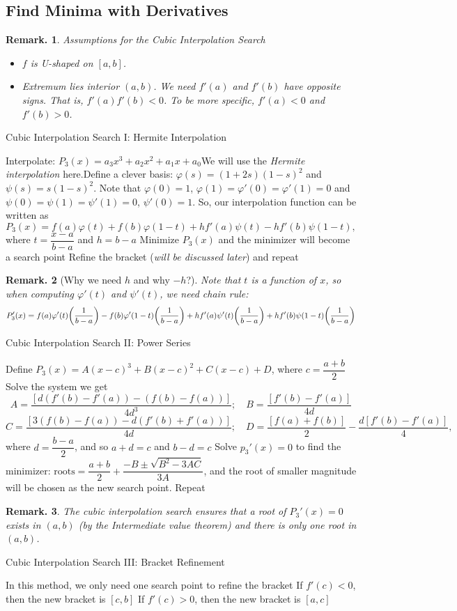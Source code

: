\documentclass[12pt, a4paper]{article}
\newtheorem{rmk}{Remark.}[section]
\def\phi{\varphi}
\begin{document}
\subsection{Find Minima with Derivatives}
\begin{rmk} Assumptions for the Cubic Interpolation Search
\begin{itemize}
	\item $f$ is U-shaped on $[a,b]$.
	\item Extremum lies interior $(a,b)$. We need $f'(a)$ and $f'(b)$ have opposite signs. That is, $f'(a)f'(b)<0$. To be more specific, $f'(a)<0$ and $f'(b)>0$.
\end{itemize}	
\end{rmk}
\begin{algorithm}
	\caption{Cubic Interpolation Search I: Hermite Interpolation}
	Interpolate: $P_3(x)=a_3x^3+a_2x^2+a_1x+a_0$\newline We will use the \textit{Hermite interpolation} here.\newline Define a clever basis: $\phi(s)=(1+2s)(1-s)^2$ and $\psi(s)=s(1-s)^2$. Note that $\phi(0)=1$, $\phi(1)=\phi'(0)=\phi'(1)=0$ and $\psi(0)=\psi(1)=\psi'(1)=0$, $\psi'(0)=1$. So, our interpolation function can be written as \[P_3(x)=f(a)\phi(t)+f(b)\phi(1-t)+hf'(a)\psi(t)-hf'(b)\psi(1-t),\] where $t=\dfrac{x-a}{b-a}$ and $h=b-a$\;
	Minimize $P_3(x)$ and the minimizer will become a search point\;
	Refine the bracket (\textit{will be discussed later}) and repeat\;
\end{algorithm}
\begin{rmk}[Why we need $h$ and why $-h$?]
	Note that $t$ is a function of $x$, so when computing $\phi'(t)$ and $\psi'(t)$, we need chain rule: \[P_3'(x)=f(a)\phi'(t)\qty(\dfrac{1}{b-a})-f(b)\phi'(1-t)\qty(\dfrac{1}{b-a})+hf'(a)\psi'(t)\qty(\dfrac{1}{b-a})+hf'(b)\psi(1-t)\qty(\dfrac{1}{b-a})\]	
\end{rmk}
\begin{algorithm}
	\caption{Cubic Interpolation Search II: Power Series}
	Define $P_3(x)=A(x-c)^3+B(x-c)^2+C(x-c)+D$, where $c=\dfrac{a+b}{2}$\;
	Solve the system we get \[A=\dfrac{[d(f'(b)-f'(a))-(f(b)-f(a))]}{4d^3};\quad B=\dfrac{[f'(b)-f'(a)]}{4d}\]\[C=\dfrac{[3(f(b)-f(a))-d(f'(b)+f'(a))]}{4d};\quad D=\dfrac{[f(a)+f(b)]}{2}-\dfrac{d[f'(b)-f'(a)]}{4},\] where $d=\dfrac{b-a}{2}$, and so $a+d=c$ and $b-d=c$\;
	Solve $p_3'(x)=0$ to find the minimizer: $\text{roots}=\dfrac{a+b}{2}+\dfrac{-B\pm\sqrt{B^2-3AC}}{3A}$, and the root of smaller magnitude will be chosen as the new search point. Repeat\;
\end{algorithm}
\begin{rmk}
	The cubic interpolation search ensures that a root of $P_3'(x)=0$ exists in $(a,b)$ (by the Intermediate value theorem) and there is only one root in $(a,b)$. 
\end{rmk}
\begin{algorithm}
	\caption{Cubic Interpolation Search III: Bracket Refinement}
	In this method, we only need one search point to refine the bracket\;
	If $f'(c)<0$, then the new bracket is $[c,b]$\;
	If $f'(c)>0$, then the new bracket is $[a,c]$\;	
\end{algorithm}
\end{document}
